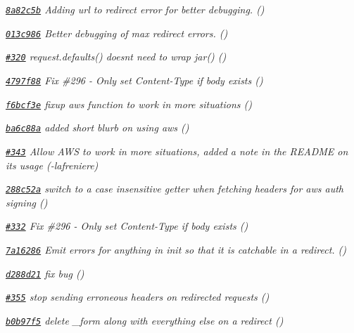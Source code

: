 \begin{DoxyItemize}
\item {\itshape \href{https://github.com/mikeal/request/commit/8a82c5b0990cc58fa4cb7f81814d13ba7ae35453}{\tt 8a82c5b} Adding url to redirect error for better debugging. ()}
\item {\itshape \href{https://github.com/mikeal/request/commit/013c986d0a8b5b2811cd06dd3733f4a3d37df1cc}{\tt 013c986} Better debugging of max redirect errors. ()}
\item {\itshape \href{https://github.com/mikeal/request/pull/320}{\tt \#320} request.\+defaults() doesn\textquotesingle{}t need to wrap jar() ()}
\item {\itshape \href{https://github.com/mikeal/request/commit/4797f88b42c3cf8680cbde09bf473678a5707aed}{\tt 4797f88} Fix \#296 -\/ Only set Content-\/\+Type if body exists ()}
\item {\itshape \href{https://github.com/mikeal/request/commit/f6bcf3eb51982180e813c69cccb942734f815ffe}{\tt f6bcf3e} fixup aws function to work in more situations ()}
\item {\itshape \href{https://github.com/mikeal/request/commit/ba6c88af5e771c2a0e007e6166e037a149561e09}{\tt ba6c88a} added short blurb on using aws ()}
\item {\itshape \href{https://github.com/mikeal/request/pull/343}{\tt \#343} Allow A\+W\+S to work in more situations, added a note in the R\+E\+A\+D\+M\+E on its usage (-\/lafreniere)}
\item {\itshape \href{https://github.com/mikeal/request/commit/288c52a2a1579164500c26136552827112801ff1}{\tt 288c52a} switch to a case insensitive getter when fetching headers for aws auth signing ()}
\item {\itshape \href{https://github.com/mikeal/request/pull/332}{\tt \#332} Fix \#296 -\/ Only set Content-\/\+Type if body exists ()}
\item {\itshape \href{https://github.com/mikeal/request/commit/7a162868de65b6de15e00c1f707b5e0f292c5f86}{\tt 7a16286} Emit errors for anything in init so that it is catchable in a redirect. ()}
\item {\itshape \href{https://github.com/mikeal/request/commit/d288d21d709fa81067f5af53737dfde06f842262}{\tt d288d21} fix bug ()}
\item {\itshape \href{https://github.com/mikeal/request/pull/355}{\tt \#355} stop sending erroneous headers on redirected requests ()}
\item {\itshape \href{https://github.com/mikeal/request/commit/b0b97f53a9e94f3aeaa05e2cda5b820668f6e3b2}{\tt b0b97f5} delete \+\_\+form along with everything else on a redirect ()}

\end{DoxyItemize}
